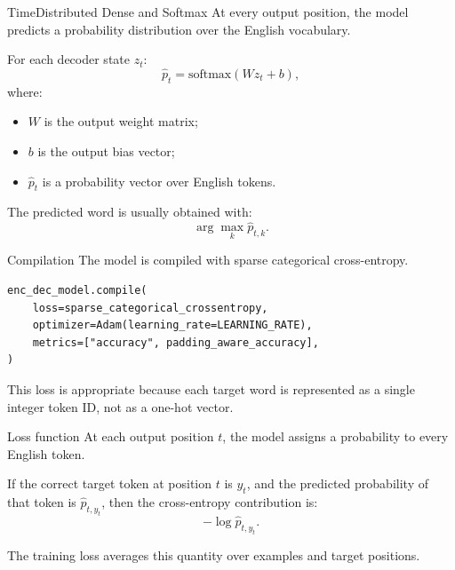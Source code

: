 \documentclass[aspectratio=169]{beamer}
\begin{document}
%
%
\begin{frame}[fragile]{TimeDistributed Dense and Softmax}
At every output position, the model predicts a probability distribution over the English vocabulary.

\vspace{0.3cm}
For each decoder state $z_t$:
\[
    \hat{p}_t = \text{softmax}(W z_t + b),
\]
where:
\begin{itemize}
    \item $W$ is the output weight matrix;
    \item $b$ is the output bias vector;
    \item $\hat{p}_t$ is a probability vector over English tokens.
\end{itemize}

\vspace{0.2cm}
The predicted word is usually obtained with:
\[
    \arg\max_k \hat{p}_{t,k}.
\]
\end{frame}
%
%
\begin{frame}[fragile]{Compilation}
The model is compiled with sparse categorical cross-entropy.

\begin{lstlisting}
enc_dec_model.compile(
    loss=sparse_categorical_crossentropy,
    optimizer=Adam(learning_rate=LEARNING_RATE),
    metrics=["accuracy", padding_aware_accuracy],
)
\end{lstlisting}

\vspace{0.2cm}
This loss is appropriate because each target word is represented as a single integer token ID, not as a one-hot vector.
\end{frame}
%
%
\begin{frame}[fragile]{Loss function}
At each output position $t$, the model assigns a probability to every English token.

\vspace{0.3cm}
If the correct target token at position $t$ is $y_t$, and the predicted probability of that token is $\hat{p}_{t,y_t}$, then the cross-entropy contribution is:
\[
    -\log \hat{p}_{t,y_t}.
\]

\vspace{0.3cm}
The training loss averages this quantity over examples and target positions.
\end{frame}
\end{document}
